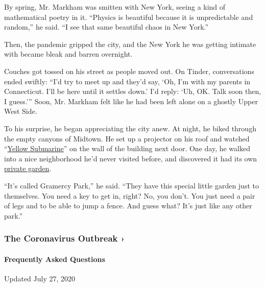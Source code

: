 By spring, Mr. Markham was smitten with New York, seeing a kind of
mathematical poetry in it. ``Physics is beautiful because it is
unpredictable and random,'' he said. ``I see that same beautiful chaos
in New York.''

Then, the pandemic gripped the city, and the New York he was getting
intimate with became bleak and barren overnight.

Couches got tossed on his street as people moved out. On Tinder,
conversations ended swiftly: ``I'd try to meet up and they'd say, `Oh,
I'm with my parents in Connecticut. I'll be here until it settles down.'
I'd reply: `Uh, OK. Talk soon then, I guess.''' Soon, Mr. Markham felt
like he had been left alone on a ghostly Upper West Side.

To his surprise, he began appreciating the city anew. At night, he biked
through the empty canyons of Midtown. He set up a projector on his roof
and watched ``\href{https://www.youtube.com/watch?v=vefJAtG-ZKI}{Yellow
Submarine}'' on the wall of the building next door. One day, he walked
into a nice neighborhood he'd never visited before, and discovered it
had its own
\href{https://gothamist.com/news/how-gramercy-park-became-a-private-playground-for-nycs-elite}{private
garden}.

``It's called Gramercy Park,'' he said. ``They have this special little
garden just to themselves. You need a key to get in, right? No, you
don't. You just need a pair of legs and to be able to jump a fence. And
guess what? It's just like any other park.''

\href{https://www.nytimes3xbfgragh.onion/news-event/coronavirus?action=click\&pgtype=Article\&state=default\&region=MAIN_CONTENT_3\&context=storylines_faq}{}

\hypertarget{the-coronavirus-outbreak-}{%
\subsubsection{The Coronavirus Outbreak
›}\label{the-coronavirus-outbreak-}}

\hypertarget{frequently-asked-questions}{%
\paragraph{Frequently Asked
Questions}\label{frequently-asked-questions}}

Updated July 27, 2020

